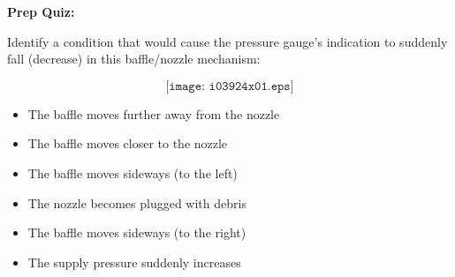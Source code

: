 \vfil \eject

\noindent
{\bf Prep Quiz:}

Identify a condition that would cause the pressure gauge's indication to suddenly fall (decrease) in this baffle/nozzle mechanism:

$$\texttt{[image: i03924x01.eps]}$$


\begin{itemize}
\item{} The baffle moves further away from the nozzle
\vskip 5pt 
\item{} The baffle moves closer to the nozzle
\vskip 5pt 
\item{} The baffle moves sideways (to the left) 
\vskip 5pt 
\item{} The nozzle becomes plugged with debris
\vskip 5pt 
\item{} The baffle moves sideways (to the right)
\vskip 5pt 
\item{} The supply pressure suddenly increases
\end{itemize}






